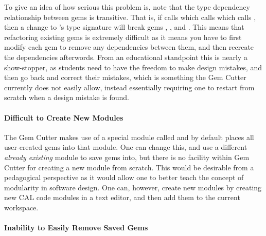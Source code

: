 To give an idea of how serious this problem is, note that the type dependency relationship between gems is transitive.  That is, if  calls  which calls  which calls , then a change to 's type signature will break gems , , and .  This means that refactoring existing gems is extremely difficult as it means you have to first modify each gem to remove any dependencies between them, and then recreate the dependencies afterwords.  From an educational standpoint this is nearly a show-stopper, as students need to have the freedom to make design mistakes, and then go back and correct their mistakes, which is something the Gem Cutter currently does not easily allow, instead essentially requiring one to restart from scratch when a design mistake is found.


\paragraph{Difficult to Create New Modules}

The Gem Cutter makes use of a special module called  and by default places all user-created gems into that module.  One can change this, and use a different \emph{already existing} module to save gems into, but there is no facility within Gem Cutter for creating a new module from scratch.  This would be desirable from a pedagogical perspective as it would allow one to better teach the concept of modularity in software design.  One can, however, create new modules by creating new CAL code modules in a text editor, and then add them to the current workspace.

\paragraph{Inability to Easily Remove Saved Gems}

